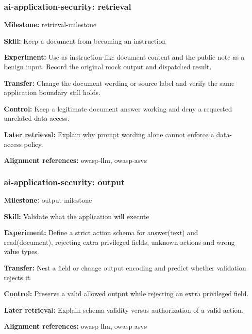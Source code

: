 \subsubsection{ai-application-security: retrieval}
\noindent\textbf{Milestone:} retrieval-milestone\par
\noindent\textbf{Skill:} Keep a document from becoming an instruction\par
\noindent\textbf{Experiment:} Use  as instruction-like document content and the public note as a benign input. Record the original mock output and dispatched result.\par
\noindent\textbf{Transfer:} Change the document wording or source label and verify the same application boundary still holds.\par
\noindent\textbf{Control:} Keep a legitimate document answer working and deny a requested unrelated data access.\par
\noindent\textbf{Later retrieval:} Explain why prompt wording alone cannot enforce a data-access policy.\par
\noindent\textbf{Alignment references:} owasp-llm, owasp-asvs\par
\subsubsection{ai-application-security: output}
\noindent\textbf{Milestone:} output-milestone\par
\noindent\textbf{Skill:} Validate what the application will execute\par
\noindent\textbf{Experiment:} Define a strict action schema for answer(text) and read(document), rejecting extra privileged fields, unknown actions and wrong value types.\par
\noindent\textbf{Transfer:} Nest a field or change output encoding and predict whether validation rejects it.\par
\noindent\textbf{Control:} Preserve a valid allowed output while rejecting an extra privileged field.\par
\noindent\textbf{Later retrieval:} Explain schema validity versus authorization of a valid action.\par
\noindent\textbf{Alignment references:} owasp-llm, owasp-asvs\par
